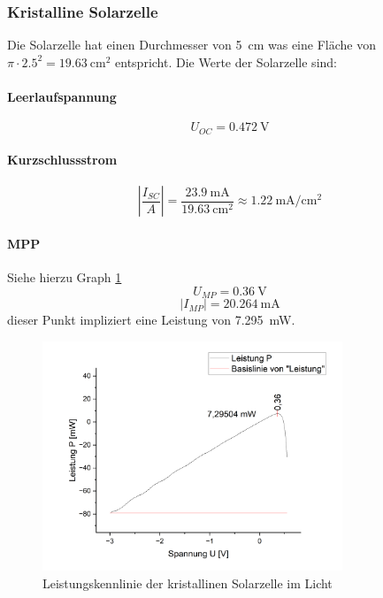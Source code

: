 \documentclass[12pt,a4paper,ngerman]{report}
\begin{document}
		
		\subsubsection{Kristalline Solarzelle}
		Die Solarzelle hat einen Durchmesser von \qty{5}{\centi\m} was eine Fläche von $\pi\cdot\num{2,5}^2=\qty{19,63}{\centi\m^2}$ entspricht. Die Werte der Solarzelle sind:
		
		\paragraph{Leerlaufspannung}
		\[	U_{OC} = \qty{0,472}{\volt} \]
		
		\paragraph{Kurzschlussstrom}
		$$\left|\frac{I_{SC}}{A}\right|=\frac{\qty{23,9}{\milli\ampere}}{\qty{19.63}{\centi\square\metre}}\approx\qty{1.22}{\milli\ampere\per\centi\square\metre} $$
		
		\paragraph{MPP} Siehe hierzu Graph \ref{fig:Leistkrishell}
		$$U_{MP}=\qty{0,36}{\volt}$$ $$\vert I_{MP}\vert=\qty{20,264}{\milli\ampere}$$ 
		dieser Punkt impliziert eine Leistung von \qty{7,295}{\milli\watt}.

		\begin{figure}
			\centering
			\includegraphics[width=0.8\textwidth]{Origin/LeistungKristall.png}
			\caption{Leistungskennlinie der kristallinen Solarzelle im Licht}
			\label{fig:Leistkrishell}
		\end{figure}
		
\end{document}
